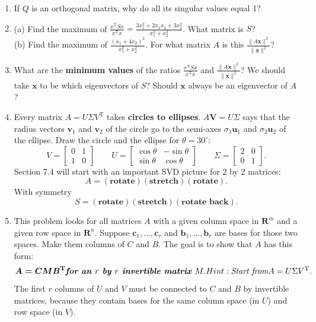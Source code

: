 \documentclass[14pt, a4paper]{article}
\begin{document}
\begin{enumerate}
    \item If $Q$ is an orthogonal matrix, why do all its singular values equal 1?

    \item (a) Find the maximum of $\frac{x^{\mathrm{T}}Sx}{x^{\mathrm{T}}x} = \frac{3x_1^2 + 2x_1x_2 + 3x_2^2}{x_1^2 + x_2^2}$. What matrix is $S$? \\
          (b) Find the maximum of $\frac{(x_1 + 4x_2)^2}{x_1^2 + x_2^2}$. For what matrix $A$ is this $\frac{\|A\boldsymbol{x}\|^2}{\|\boldsymbol{x}\|^2}$?

    \item What are the \textbf{minimum values} of the ratios $\frac{x^{\mathrm{T}}Sx}{x^{\mathrm{T}}x}$ and $\frac{\|A\boldsymbol{x}\|^2}{\|\boldsymbol{x}\|^2}$? We should take $\boldsymbol{x}$ to be which eigenvectors of $S$? Should $\boldsymbol{x}$ always be an eigenvector of $A$?

    \item Every matrix $A = U\Sigma V^{\mathrm{T}}$ takes \textbf{circles to ellipses}. $A\boldsymbol{V} = U\Sigma$ says that the radius vectors $\boldsymbol{v}_1$ and $\boldsymbol{v}_2$ of the circle go to the semi-axes $\sigma_1\boldsymbol{u}_1$ and $\sigma_2\boldsymbol{u}_2$ of the ellipse. Draw the circle and the ellipse for $\theta = 30^{\circ}$:
          \[
              V = \begin{bmatrix} 0 & 1 \\ 1 & 0 \end{bmatrix} \qquad U = \begin{bmatrix} \cos\theta & -\sin\theta \\ \sin\theta & \cos\theta \end{bmatrix} \qquad \Sigma = \begin{bmatrix} 2 & 0 \\ 0 & 1 \end{bmatrix}.
          \]
          Section 7.4 will start with an important SVD picture for 2 by 2 matrices:
          \[
              A = (\textbf{rotate})(\textbf{stretch})(\textbf{rotate}).
          \]
          With symmetry
          \[
              S = (\textbf{rotate})(\textbf{stretch})(\textbf{rotate back}).
          \]
    \item This problem looks for all matrices $A$ with a given column space in $\mathbf{R}^m$ and a given row space in $\mathbf{R}^n$. Suppose $\boldsymbol{c}_1, \dots, \boldsymbol{c}_r$ and $\boldsymbol{b}_1, \dots, \boldsymbol{b}_r$ are bases for those two spaces. Make them columns of $C$ and $B$. The goal is to show that $A$ has this form: \\
          \[
              \boldsymbol{A = CMB^{\mathrm{T}}} \textbf{\textit{for an $r$ by $r$ invertible matrix $M$}}. Hint: \textit{Start from} A = U\Sigma V^{\mathrm{T}}.
          \]
          The first $r$ columns of $U$ and $V$ must be connected to $C$ and $B$ by invertible matrices, because they contain bases for the same column space (in $U$) and row space (in $V$).
\end{enumerate}
\end{document}
